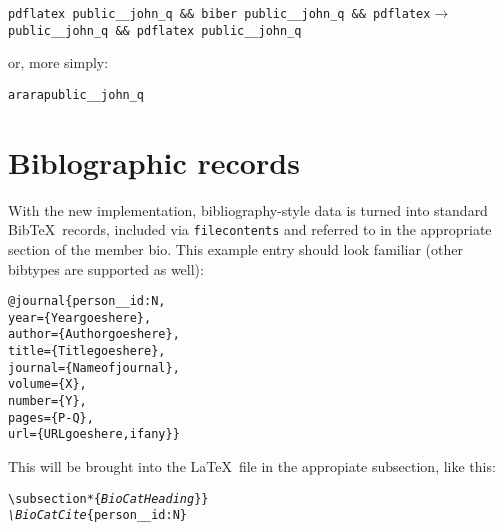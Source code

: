 \documentclass[letterpaper]{article}
\begin{document}
\begin{alltt}
{\tt pdflatex public__john_q \&\& biber public__john_q \&\& pdflatex\(\rightarrow\)
    public__john_q \&\& pdflatex public__john_q}
\end{alltt}

or, more simply:

\begin{alltt}
arara public__john_q
\end{alltt}

\section{Biblographic records}



With the new implementation, bibliography-style data is turned into
standard Bib\TeX\ records, included via {\tt filecontents} and
referred to in the appropriate section of the member bio.
This example entry should look familiar (other bibtypes are supported as well):

\begin{alltt}
@journal\{person__id:N,
year=\{Year goes here\},
author=\{Author goes here\},
title=\{Title goes here\},
journal=\{Name of journal\},
volume=\{X\},
number=\{Y\},
pages=\{P-Q\},
url=\{URL goes here, if any\}\}
\end{alltt}

This will be brought into the \LaTeX\ file in the appropiate
subsection, like this:

\begin{alltt}
\verb|\|subsection\verb|*{|\emph{BioCat Heading}\verb|}}|
\emph{\textbackslash}\emph{BioCatCite}\verb|{|person__id:N\verb|}|
\end{alltt}
\end{document}
